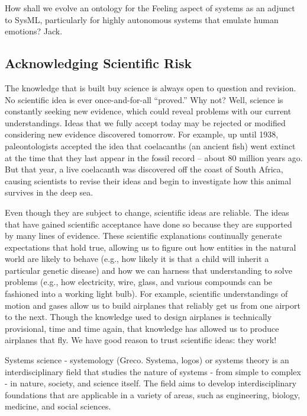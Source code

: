 How shall we evolve an ontology for the Feeling aspect of systems as an adjunct to SysML, particularly for highly autonomous systems that emulate human emotions? Jack.

\subsection{Acknowledging Scientific Risk}

The knowledge that is built buy science is always open to question and revision. No scientific idea is ever once-and-for-all ``proved.''  Why not?  Well, science is constantly seeking new evidence, which could reveal problems with our current understandings. Ideas that we fully accept today may be rejected or modified considering new evidence discovered tomorrow. For example, up until 1938, paleontologists accepted the idea that coelacanths (an ancient fish) went extinct at the time that they last appear in the fossil record – about 80 million years ago. But that year, a live coelacanth was discovered off the coast of South Africa, causing scientists to revise their ideas and begin to investigate how this animal survives in the deep sea.

Even though they are subject to change, scientific ideas are reliable. The ideas that have gained scientific acceptance have done so because they are supported by many lines of evidence. These scientific explanations continually generate expectations that hold true, allowing us to figure out how entities in the natural world are likely to behave (e.g., how likely it is that a child will inherit a particular genetic disease) and how we can harness that understanding to solve problems (e.g., how electricity, wire, glass, and various compounds can be fashioned into a working light bulb). For example, scientific understandings of motion and gases allow us to build airplanes that reliably get us from one airport to the next. Though the knowledge used to design airplanes is technically provisional, time and time again, that knowledge has allowed us to produce airplanes that fly. We have good reason to trust scientific ideas: they work!

Systems science - systemology (Greco. Systema, logos) or systems theory is an interdisciplinary field that studies the nature of systems - from simple to complex - in nature, society, and science itself. The field aims to develop interdisciplinary foundations that are applicable in a variety of areas, such as engineering, biology, medicine, and social sciences.

